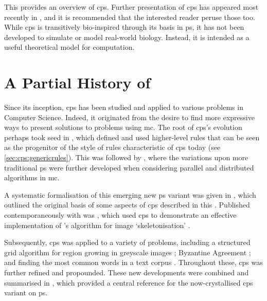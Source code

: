 This  provides an overview of \gls{cps}.  Further presentation of \gls{cps} has appeared most recently in \cite{Nicolescu2018,Henderson2019,Henderson2020,Liu2020,Liu2021}, and it is recommended that the interested reader peruse those too.  While \gls{cps} is transitively bio-inspired through its basis in \gls{ps}, it has not been developed to simulate or model real-world biology.  Instead, it is intended as a useful theoretical model for computation.


\section{A Partial History of }

Since its inception, \gls{cps} has been studied and applied to various problems in Computer Science.  Indeed, it originated from the desire to find more expressive ways to present solutions to problems using \gls{mc}.  The root of \gls{cps}'s evolution perhaps took seed in \cite{Balanescu2011}, which defined and used higher-level rules that can be seen as the progenitor of the style of rules characteristic of \gls{cps} today (see \cref{sec:cps:genericrules}).  This was followed by \cite{Nicolescu2012}, where the variations upon more traditional \gls{ps} were further developed when considering parallel and distributed algorithms in \gls{mc}.

A systematic formalisation of this emerging new \gls{ps} variant was given in \cite{Nicolescu2014a}, which outlined the original basis of some aspects of \gls{cps} described in this .  Published contemporaneously with \cite{Nicolescu2014a} was \cite{Nicolescu2014}, which used \gls{cps} to demonstrate an effective implementation of \citeauthor{Guo1989}'s algorithm for image `skeletonisation' \cite{Guo1989}.

Subsequently, \gls{cps} was applied to a variety of problems, including a structured grid algorithm for region growing in greyscale images \cite{Nicolescu2015}; Byzantine Agreement \cite{Nicolescu2017}; and finding the most common words in a text corpus \cite{Nicolescu2018a}.  Throughout these, \gls{cps} was further refined and propounded.  These new developments were combined and summarised in \cite{Nicolescu2018}, which provided a central reference for the now-crystallised \gls{cps} variant on \gls{ps}.

